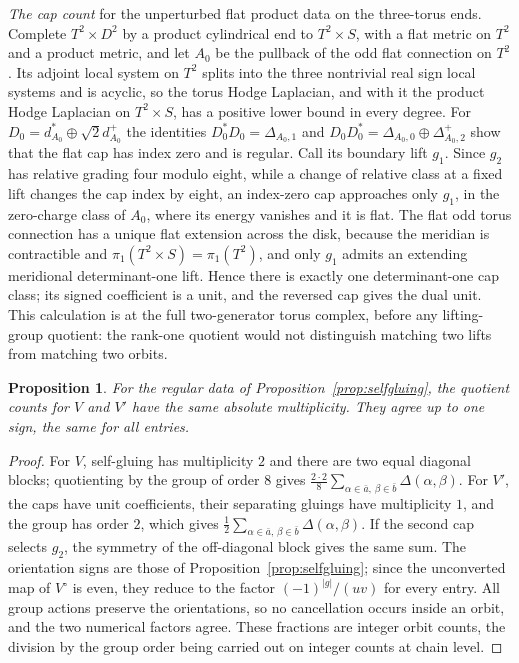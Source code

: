 \documentclass[11pt]{amsart}
\newtheorem{proposition}[theorem]{Proposition}
\theoremstyle{definition}
\theoremstyle{remark}
\theoremstyle{plain}
\numberwithin{equation}{section}
\begin{document}
\emph{The cap count} for the unperturbed flat product data on the three-torus
ends. Complete $T^2\times D^2$ by a product cylindrical end to
$T^2\times S$, with a flat metric on $T^2$ and a product metric, and let $A_0$ be
the pullback of the odd flat connection on $T^2$. Its adjoint local system on
$T^2$ splits into the three nontrivial real sign local systems and is acyclic,
so the torus Hodge Laplacian, and with it the product Hodge Laplacian on
$T^2\times S$, has a positive lower bound in every degree. For
$D_0=d_{A_0}^*\oplus\sqrt2d_{A_0}^+$ the identities $D_0^*D_0=\Delta_{A_0,1}$
and $D_0D_0^*=\Delta_{A_0,0}\oplus\Delta_{A_0,2}^+$ show that the flat cap has
index zero and is regular. Call its boundary lift $g_1$. Since $g_2$ has
relative grading four modulo eight, while a change of relative class at a
fixed lift changes the cap index by eight, an index-zero cap approaches only
$g_1$, in the zero-charge class of $A_0$, where its energy vanishes and it is
flat. The flat odd torus connection has a unique flat extension across the
disk, because the meridian is contractible and
$\pi_1(T^2\times S)=\pi_1(T^2)$, and only $g_1$ admits an extending meridional
determinant-one lift. Hence there is exactly one determinant-one cap class;
its signed coefficient is a unit, and the reversed cap gives the dual unit.
This calculation is at the full two-generator torus complex, before any
lifting-group quotient: the rank-one quotient would not distinguish matching
two lifts from matching two orbits.

\begin{proposition}\label{prop:capped}
For the regular data of Proposition~\ref{prop:selfgluing}, the
quotient counts for $V$ and $V'$ have the same absolute
multiplicity. They agree up to one sign, the same
for all entries.
\end{proposition}
\begin{proof}
For $V$, self-gluing has multiplicity $2$ and there are two equal diagonal
blocks; quotienting by the group of order $8$ gives
$\frac{2\cdot2}{8}\sum_{\alpha\in\bar a,\,\beta\in\bar b}\Delta(\alpha,\beta)$.
For $V'$, the caps have unit coefficients, their separating gluings have
multiplicity $1$, and the group has order $2$, which gives
$\frac12\sum_{\alpha\in\bar a,\,\beta\in\bar b}\Delta(\alpha,\beta)$. If the
second cap selects $g_2$, the symmetry of the off-diagonal block gives the same
sum. The orientation signs are those of Proposition~\ref{prop:selfgluing}; since
the unconverted map of $V^\circ$ is even, they reduce to the factor
$(-1)^{|g|}/(uv)$ for every entry. All group actions preserve the orientations,
so no cancellation occurs inside an orbit, and the two numerical factors agree.
These fractions are integer orbit
counts, the division by the group order being carried out on integer counts
at chain level.
\end{proof}
\end{document}
